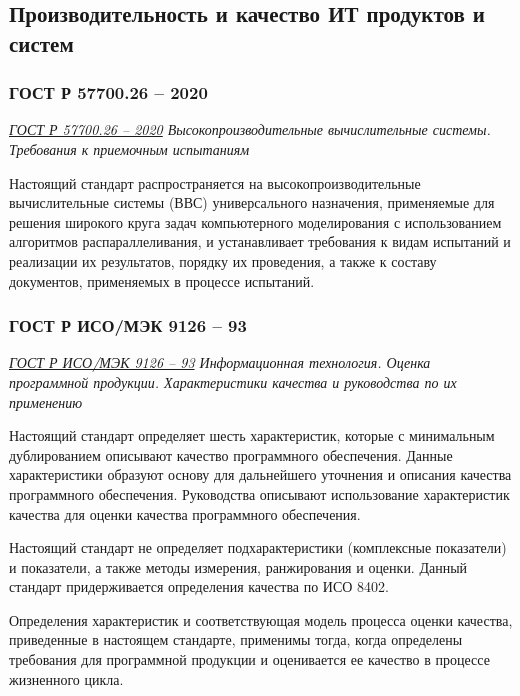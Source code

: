 


\subsection{Производительность и качество ИТ продуктов и систем}

\subsubsection{ГОСТ Р 57700.26 -- 2020}

\emph{\href{https://docs.cntd.ru/document/573114591}{ГОСТ Р 57700.26 -- 2020}
Высокопроизводительные вычислительные системы.
Требования к приемочным испытаниям
}

Настоящий стандарт распространяется
на высокопроизводительные вычислительные системы (ВВС)
универсального назначения,
применяемые для решения широкого круга задач компьютерного моделирования
с использованием алгоритмов распараллеливания,
и устанавливает требования к видам испытаний и реализации их результатов,
порядку их проведения, а также к составу документов,
применяемых в процессе испытаний.

\subsubsection{ГОСТ Р ИСО/МЭК 9126 -- 93}

\emph{\href{https://docs.cntd.ru/document/1200009076}{ГОСТ Р ИСО/МЭК 9126 -- 93}
Информационная технология.
Оценка программной продукции.
Характеристики качества и руководства по их применению
}

Настоящий стандарт определяет шесть характеристик,
которые с минимальным дублированием описывают качество программного обеспечения.
Данные характеристики образуют основу для дальнейшего уточнения
и описания качества программного обеспечения.
Руководства описывают использование характеристик качества
для оценки качества программного обеспечения.

Настоящий стандарт не определяет подхарактеристики (комплексные показатели)
и показатели, а также методы измерения, ранжирования и оценки.
Данный стандарт придерживается определения качества по ИСО 8402.

Определения характеристик и соответствующая модель процесса оценки качества,
приведенные в настоящем стандарте, применимы тогда,
когда определены требования для программной продукции
и оценивается ее качество в процессе жизненного цикла.

